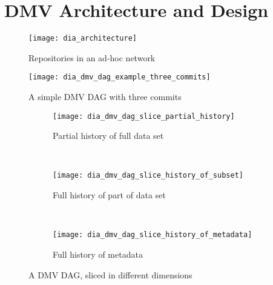 \documentclass[
    usenglish,
]{nik}
\begin{document}
\section{DMV Architecture and Design}


\begin{figure}[]
    \centering
    \texttt{[image: dia\_architecture]}
    \caption{Repositories in an ad-hoc network}
    \label{fig:dia_architecture}
\end{figure}

\begin{figure}[]
    \centering
    \texttt{[image: dia\_dmv\_dag\_example\_three\_commits]}
    \caption{A simple DMV DAG with three commits}
    \label{dia_dmv_dag_example_three_commits}
\end{figure}


\newcommand{\slicediagramwidth}{0.45\textwidth}

\begin{figure}[]

    \centering

    \begin{subfigure}[]{\slicediagramwidth}
        \texttt{[image: dia\_dmv\_dag\_slice\_partial\_history]}
        \caption{Partial history of full data set}
        \label{dia_dmv_dag_slice_partial_history}
    \end{subfigure}
    ~
    \begin{subfigure}[]{\slicediagramwidth}
        \texttt{[image: dia\_dmv\_dag\_slice\_history\_of\_subset]}
        \caption{Full history of part of data set}
        \label{dia_dmv_dag_slice_history_of_subset}
    \end{subfigure}
    ~
    \begin{subfigure}[]{\slicediagramwidth}
        \texttt{[image: dia\_dmv\_dag\_slice\_history\_of\_metadata]}
        \caption{Full history of metadata}
        \label{dia_dmv_dag_slice_history_of_metadata}
    \end{subfigure}

    \caption{A DMV DAG, sliced in different dimensions}
\end{figure}
\end{document}
